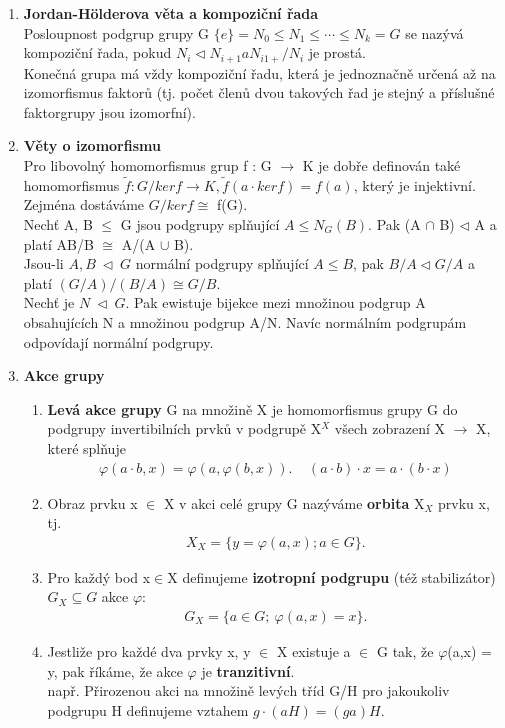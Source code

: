 \documentclass[12pt,a4paper]{article}
\begin{document}
\begin{enumerate}
	\item \textbf{Jordan-Hölderova věta a kompoziční řada} \\
	Posloupnost podgrup grupy G $\{e\} = N_0 \leq N_1 \leq \cdots \leq N_k = G$ se nazývá kompoziční řada, pokud $N_i \lhd N_{i+1} a N_{i1+}/N_i$ je prostá.  \\Konečná grupa má vždy kompoziční řadu, která je jednoznačně určená až na izomorfismus faktorů (tj. počet členů dvou takových řad je stejný a příslušné faktorgrupy jsou izomorfní).
	
	\item \textbf{Věty o izomorfismu} \\
	Pro libovolný homomorfismus grup f : G $\rightarrow$ K je dobře definován také homomorfismus $\tilde{f} : G/ker f \rightarrow K, \tilde{f}(a \cdot ker f) = f(a)$, který je injektivní. Zejména dostáváme $G/ker f \cong$ f(G). \\
	
	Nechť A, B $\leq$ G jsou podgrupy splňující $A \leq N_G(B)$. Pak (A $\cap$ B) $\lhd$ A a platí AB/B $\cong$ A/(A $\cup$ B). \\
	
	Jsou-li $A, B\ \lhd \ G$ normální podgrupy splňující $A \leq B$, pak $B/A \lhd G/A$ a platí $(G/A)/(B/A) \cong G/B$. \\
	
	Nechť je $N \ \lhd\ G$. Pak ewistuje bijekce mezi množinou podgrup A obsahujících N a množinou podgrup A/N. Navíc normálním podgrupám odpovídají normální podgrupy.
	
	\item \textbf{Akce grupy}
	
	\begin{enumerate}
		\item \textbf{Levá akce grupy} G na množině X je homomorfismus grupy G do podgrupy invertibilních prvků v podgrupě X$^X$ všech zobrazení X $\rightarrow$ X, které splňuje 
		\begin{align*}
		\varphi(a\cdot b,x) = \varphi(a,\varphi(b,x)).\	\ \ \ \	(a\cdot b)\cdot x = a\cdot (b\cdot x)
		\end{align*} 
		
		\item Obraz prvku x $\in$ X v akci celé grupy G nazýváme \textbf{orbita} X$_X$ prvku x, tj.
		\begin{align*}
		X_X = \{y = \varphi(a,x); a\in G\}.
		\end{align*} 
		
		\item Pro každý bod x$\in$X definujeme \textbf{izotropní podgrupu} (též stabilizátor) $G_X \subseteq G$ akce $\varphi$:
		\begin{align*}
		G_X = \{a \in G;\ \varphi(a,x) =x\}.
		\end{align*}
		\item 
		Jestliže pro každé dva prvky x, y $\in$ X existuje a $\in$ G tak, že $\varphi$(a,x) = y, pak říkáme, že akce $\varphi$ je \textbf{tranzitivní}. \\
		např. Přirozenou akci na množině levých tříd G/H pro jakoukoliv podgrupu H definujeme vztahem $g\cdot (aH) = (ga) H$.
		

\end{enumerate}
\end{enumerate}
\end{document}

